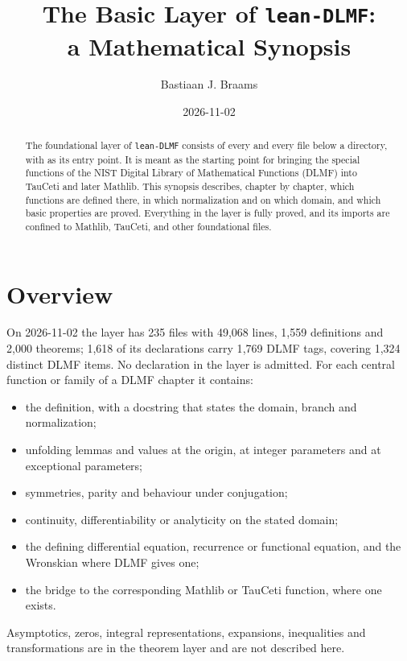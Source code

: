 \documentclass[11pt,a4paper]{article}
\begin{document}
\title{The Basic Layer of \texttt{lean-DLMF}:\\a Mathematical Synopsis}
\author{Bastiaan J. Braams}
\date{2026-11-02}
\maketitle

\begin{abstract}
  The foundational layer of \texttt{lean-DLMF} consists of every  and every
  file below a  directory, with  as its entry point. It is
  meant as the starting point for bringing the special functions of the NIST Digital Library
  of Mathematical Functions (DLMF) into TauCeti and later Mathlib. This synopsis describes,
  chapter by chapter, which functions are defined there, in which normalization and on which
  domain, and which basic properties are proved. Everything in the layer is fully proved, and
  its imports are confined to Mathlib, TauCeti,  and other foundational
  files.
\end{abstract}

\section{Overview}

On 2026-11-02 the layer has 235 files with 49{,}068 lines, 1{,}559 definitions and
2{,}000 theorems; 1{,}618 of its declarations carry 1{,}769 DLMF tags, covering 1{,}324
distinct DLMF items. No declaration in the layer is admitted. For each central
function or family of a DLMF chapter it contains:
\begin{itemize}
  \item the definition, with a docstring that states the domain, branch and normalization;
  \item unfolding lemmas and values at the origin, at integer parameters and at exceptional
    parameters;
  \item symmetries, parity and behaviour under conjugation;
  \item continuity, differentiability or analyticity on the stated domain;
  \item the defining differential equation, recurrence or functional equation, and the
    Wronskian where DLMF gives one;
  \item the bridge to the corresponding Mathlib or TauCeti function, where one exists.
\end{itemize}
Asymptotics, zeros, integral representations, expansions, inequalities and transformations
are in the theorem layer and are not described here.
\end{document}

